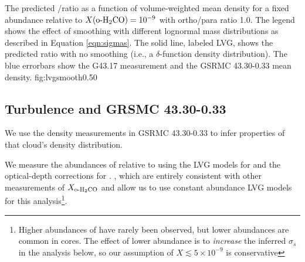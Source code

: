 {The predicted \formaldehyde \oneone/\twotwo ratio as a function of volume-weighted mean
density for a fixed abundance relative to \hh $X(\textrm{o-H}_2\textrm{CO}) = 10^{-9}$  with \hh
ortho/para ratio 1.0.  The legend shows the effect of smoothing with different
lognormal mass distributions as described in Equation \ref{eqn:sigmas}.  %
The solid line, labeled LVG, shows the predicted ratio
with no smoothing (i.e., a $\delta$-function density distribution).
The blue errorbars show the G43.17 \formaldehyde measurement and the GSRMC
43.30-0.33 mean density.
}
{fig:lvgsmooth}{0.5}{0}

\subsection{Turbulence and GRSMC 43.30-0.33}
\label{sec:grsmcturb}
We use the density measurements in GSRMC 43.30-0.33 to infer properties of that
cloud's density distribution.

We measure the abundances of \ortho relative to \thirteenco using the LVG
models for \formaldehyde and the \citet{RomanDuval2010a} optical-depth
corrections for \thirteenco.
, which are
entirely consistent with other measurements of $X_{\textrm{o-H}_2\textrm{CO}}$
\citep{Johnstone2003a} and allow us to use constant abundance LVG models for this
analysis\footnote{Higher abundances of \formaldehyde have rarely been observed,
but lower abundances are common in cores.  The effect of lower abundance is to
\emph{increase} the inferred $\sigma_s$ in the analysis below, so our
assumption of $X\lesssim5\times10^{-9}$ is conservative}.  

